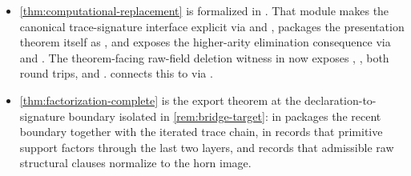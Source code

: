 \documentclass{lmcs}
\begin{document}
{\begin{itemize}[nosep]
\item \autoref{thm:computational-replacement} is formalized in . That module makes the canonical trace-signature interface explicit via  and , packages the presentation theorem itself as , and exposes the higher-arity elimination consequence via  and . The theorem-facing raw-field deletion witness in  now exposes , , both round trips, and .  connects this to  via .
\item \autoref{thm:factorization-complete} is the export theorem at the declaration-to-signature boundary isolated in \autoref{rem:bridge-target}:  in  packages the recent boundary together with the iterated trace chain,  in  records that primitive support factors through the last two layers, and  records that admissible raw structural clauses normalize to the horn image.

\end{itemize}}
\end{document}
